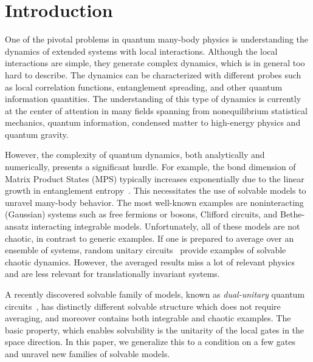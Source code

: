 \documentclass[aps,prx,twocolumn,notitlepage,nofootinbib,nobalancelastpage]{revtex4-2}
\theoremstyle{break}
\newcommand{\1}{\mathbbm{1}}
\theoremstyle{plain}
\theoremstyle{plain}
\theoremstyle{plain}
\begin{document}
\section{Introduction} \label{sec:Intro}

One of the pivotal problems in quantum many-body physics is understanding the dynamics of extended systems with local interactions. Although the local interactions are simple, they generate complex dynamics, which is in general too hard to describe.
The dynamics can be characterized with different probes such as local correlation functions, entanglement spreading, and other quantum information quantities.
The understanding of this type of dynamics is currently at the center of attention in many fields spanning from nonequilibrium statistical mechanics, quantum information, condensed matter to high-energy physics and quantum gravity.


However, the complexity of quantum dynamics, both analytically and numerically, presents a significant hurdle. For example, the bond dimension of Matrix Product States (MPS) typically increases exponentially due to the linear growth in entanglement entropy~\cite{Daley2004time,Schuch2008entropy}. 
This necessitates the use of solvable models to unravel many-body behavior. The most well-known examples are noninteracting (Gaussian) systems such as free fermions or bosons, Clifford circuits, and Bethe-ansatz interacting integrable models. 
Unfortunately, all of these models are not chaotic, in contrast to generic examples. 
If one is prepared to average over an ensemble of systems, random unitary circuits~\cite{%
fisher2023random} provide examples of solvable chaotic dynamics. However, the averaged results miss a lot of relevant physics and are less relevant for translationally invariant systems.


A recently discovered solvable family of models, known as \emph{dual-unitary}  quantum circuits~\cite{bertini2019exact}, has distinctly different solvable structure which does not require averaging, and moreover contains both integrable and chaotic examples.
The basic property, which enables solvability is the unitarity of the local gates in the space direction. In this paper, we generalize this to a condition on a few gates and unravel new families of solvable models.
\end{document}
